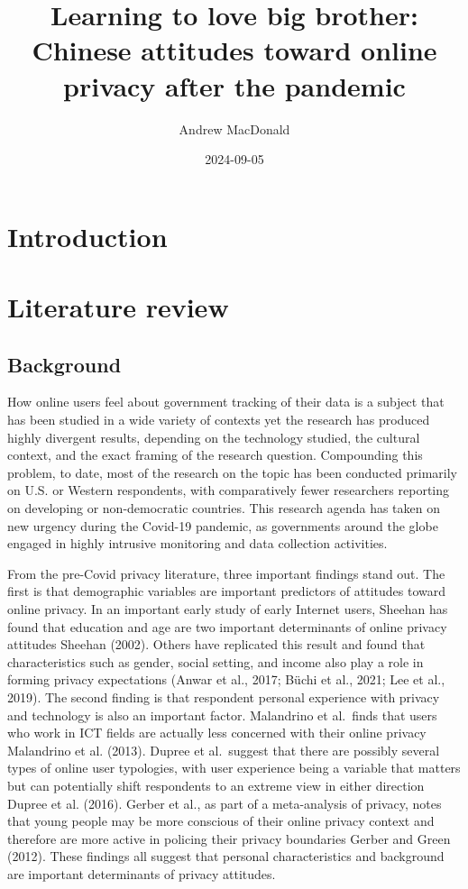 \documentclass[
  letterpaper,
  DIV=11,
  numbers=noendperiod]{scrartcl}
\title{Learning to love big brother: Chinese attitudes toward online
privacy after the pandemic}
\author{Andrew MacDonald}
\date{2024-09-05}
\begin{document}
\maketitle

\section{Introduction}\label{sec-introduction}

\section{Literature review}\label{sec-litreview}

\subsection{Background}\label{background}

How online users feel about government tracking of their data is a
subject that has been studied in a wide variety of contexts yet the
research has produced highly divergent results, depending on the
technology studied, the cultural context, and the exact framing of the
research question. Compounding this problem, to date, most of the
research on the topic has been conducted primarily on U.S. or Western
respondents, with comparatively fewer researchers reporting on
developing or non-democratic countries. This research agenda has taken
on new urgency during the Covid-19 pandemic, as governments around the
globe engaged in highly intrusive monitoring and data collection
activities.

From the pre-Covid privacy literature, three important findings stand
out. The first is that demographic variables are important predictors of
attitudes toward online privacy. In an important early study of early
Internet users, Sheehan has found that education and age are two
important determinants of online privacy attitudes Sheehan (2002).
Others have replicated this result and found that characteristics such
as gender, social setting, and income also play a role in forming
privacy expectations (Anwar et al., 2017; Büchi et al., 2021; Lee et
al., 2019). The second finding is that respondent personal experience
with privacy and technology is also an important factor. Malandrino et
al.~finds that users who work in ICT fields are actually less concerned
with their online privacy Malandrino et al. (2013). Dupree et
al.~suggest that there are possibly several types of online user
typologies, with user experience being a variable that matters but can
potentially shift respondents to an extreme view in either direction
Dupree et al. (2016). Gerber et al., as part of a meta-analysis of
privacy, notes that young people may be more conscious of their online
privacy context and therefore are more active in policing their privacy
boundaries Gerber and Green (2012). These findings all suggest that
personal characteristics and background are important determinants of
privacy attitudes.
\end{document}
